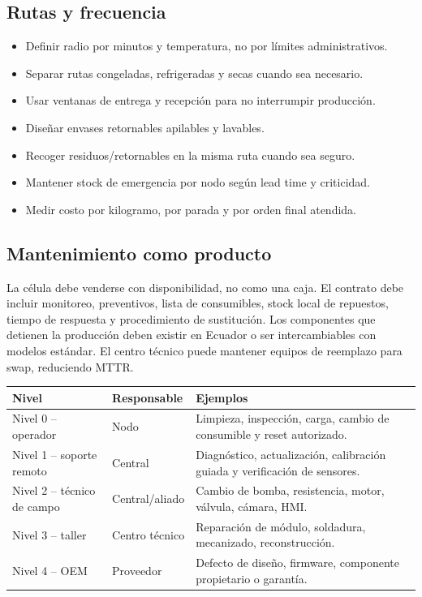 \documentclass[11pt,a4paper]{article}
\begin{document}
\subsection{Rutas y frecuencia}
\begin{itemize}
\item Definir radio por minutos y temperatura, no por límites administrativos.
\item Separar rutas congeladas, refrigeradas y secas cuando sea necesario.
\item Usar ventanas de entrega y recepción para no interrumpir producción.
\item Diseñar envases retornables apilables y lavables.
\item Recoger residuos/retornables en la misma ruta cuando sea seguro.
\item Mantener stock de emergencia por nodo según lead time y criticidad.
\item Medir costo por kilogramo, por parada y por orden final atendida.
\end{itemize}

\subsection{Mantenimiento como producto}
La célula debe venderse con disponibilidad, no como una caja. El contrato debe incluir monitoreo,
preventivos, lista de consumibles, stock local de repuestos, tiempo de respuesta y procedimiento de
sustitución. Los componentes que detienen la producción deben existir en Ecuador o ser intercambiables
con modelos estándar. El centro técnico puede mantener equipos de reemplazo para swap, reduciendo MTTR.

{\small
\begin{xltabular}{\textwidth}{@{}P{4cm}P{2.8cm}L@{}}
\toprule
\textbf{Nivel} & \textbf{Responsable} & \textbf{Ejemplos}\\ \midrule
Nivel 0 -- operador & Nodo & Limpieza, inspección, carga, cambio de consumible y reset autorizado.\\
Nivel 1 -- soporte remoto & Central & Diagnóstico, actualización, calibración guiada y verificación de sensores.\\
Nivel 2 -- técnico de campo & Central/aliado & Cambio de bomba, resistencia, motor, válvula, cámara, HMI.\\
Nivel 3 -- taller & Centro técnico & Reparación de módulo, soldadura, mecanizado, reconstrucción.\\
Nivel 4 -- OEM & Proveedor & Defecto de diseño, firmware, componente propietario o garantía.\\
\bottomrule
\end{xltabular}}
\end{document}

